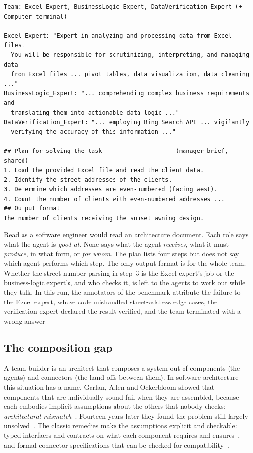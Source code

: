 \documentclass[10pt,a4paper]{article}
\newcommand{\file}[1]{\texttt{#1}}
\begin{document}
\begin{lstlisting}[style=raw, caption={Raw input: a team specification produced by CaptainAgent for one GAIA task (Who\&When, Algorithm-Generated, file \file{1.json}; role prompts abridged, plan verbatim).}, label={lst:captain}]
Team: Excel_Expert, BusinessLogic_Expert, DataVerification_Expert (+ Computer_terminal)

Excel_Expert: "Expert in analyzing and processing data from Excel files.
  You will be responsible for scrutinizing, interpreting, and managing data
  from Excel files ... pivot tables, data visualization, data cleaning ..."
BusinessLogic_Expert: "... comprehending complex business requirements and
  translating them into actionable data logic ..."
DataVerification_Expert: "... employing Bing Search API ... vigilantly
  verifying the accuracy of this information ..."

## Plan for solving the task                     (manager brief, shared)
1. Load the provided Excel file and read the client data.
2. Identify the street addresses of the clients.
3. Determine which addresses are even-numbered (facing west).
4. Count the number of clients with even-numbered addresses ...
## Output format
The number of clients receiving the sunset awning design.
\end{lstlisting}

Read  as a software engineer would read an architecture
document. Each role says what the agent is \emph{good at}. None says what
the agent \emph{receives}, what it must \emph{produce}, in what form, or
\emph{for whom}. The plan lists four steps but does not say which agent
performs which step. The only output format is for the whole team. Whether
the street-number parsing in step~3 is the Excel expert's job or the
business-logic expert's, and who checks it, is left to the agents to work
out while they talk. In this run, the annotators of the benchmark attribute
the failure to the Excel expert, whose code mishandled street-address edge
cases; the verification expert declared the result verified, and the team
terminated with a wrong answer.

\subsection{The composition gap}

A team builder is an architect that composes a system out of components (the
agents) and connectors (the hand-offs between them). In software
architecture this situation has a name. Garlan, Allen and Ockerbloom showed
that components that are individually sound fail when they are assembled,
because each embodies implicit assumptions about the others that nobody
checks: \emph{architectural mismatch}~\cite{garlan1995mismatch}. Fourteen
years later they found the problem still largely
unsolved~\cite{garlan2009mismatch}. The classic remedies make the
assumptions explicit and checkable: typed interfaces and contracts on what
each component requires and ensures~\cite{meyer1992dbc}, and formal
connector specifications that can be checked for
compatibility~\cite{allen1997connection}.
\end{document}
